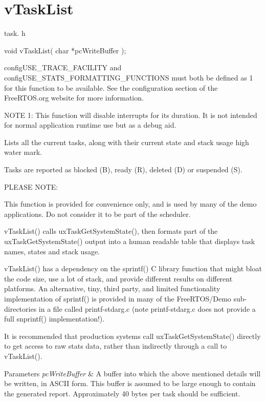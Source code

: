 \hypertarget{group__v_task_list}{}\section{v\+Task\+List}
\label{group__v_task_list}
task. h 
\begin{DoxyPre}void vTaskList( char *pcWriteBuffer );\end{DoxyPre}


config\+U\+S\+E\+\_\+\+T\+R\+A\+C\+E\+\_\+\+F\+A\+C\+I\+L\+I\+TY and config\+U\+S\+E\+\_\+\+S\+T\+A\+T\+S\+\_\+\+F\+O\+R\+M\+A\+T\+T\+I\+N\+G\+\_\+\+F\+U\+N\+C\+T\+I\+O\+NS must both be defined as 1 for this function to be available. See the configuration section of the Free\+R\+T\+O\+S.\+org website for more information.

N\+O\+TE 1\+: This function will disable interrupts for its duration. It is not intended for normal application runtime use but as a debug aid.

Lists all the current tasks, along with their current state and stack usage high water mark.

Tasks are reported as blocked (\textquotesingle{}B\textquotesingle{}), ready (\textquotesingle{}R\textquotesingle{}), deleted (\textquotesingle{}D\textquotesingle{}) or suspended (\textquotesingle{}S\textquotesingle{}).

P\+L\+E\+A\+SE N\+O\+TE\+:

This function is provided for convenience only, and is used by many of the demo applications. Do not consider it to be part of the scheduler.

v\+Task\+List() calls ux\+Task\+Get\+System\+State(), then formats part of the ux\+Task\+Get\+System\+State() output into a human readable table that displays task names, states and stack usage.

v\+Task\+List() has a dependency on the sprintf() C library function that might bloat the code size, use a lot of stack, and provide different results on different platforms. An alternative, tiny, third party, and limited functionality implementation of sprintf() is provided in many of the Free\+R\+T\+O\+S/\+Demo sub-\/directories in a file called printf-\/stdarg.\+c (note printf-\/stdarg.\+c does not provide a full snprintf() implementation!).

It is recommended that production systems call ux\+Task\+Get\+System\+State() directly to get access to raw stats data, rather than indirectly through a call to v\+Task\+List().


\begin{DoxyParams}{Parameters}
{\em pc\+Write\+Buffer} & A buffer into which the above mentioned details will be written, in A\+S\+C\+II form. This buffer is assumed to be large enough to contain the generated report. Approximately 40 bytes per task should be sufficient. \\
\hline
\end{DoxyParams}
